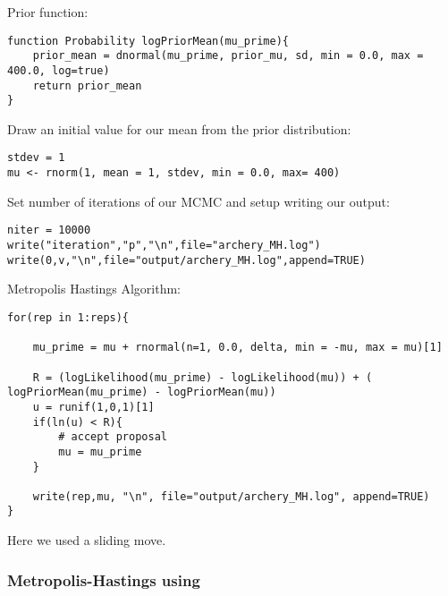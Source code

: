 Prior function: 

{\tt \begin{snugshade*}
 \begin{lstlisting}
function Probability logPriorMean(mu_prime){
	prior_mean = dnormal(mu_prime, prior_mu, sd, min = 0.0, max = 400.0, log=true)
	return prior_mean
}
\end{lstlisting}
\end{snugshade*}}



Draw an initial value for our mean from the prior distribution:

{\tt \begin{snugshade*}
 \begin{lstlisting}
stdev = 1
mu <- rnorm(1, mean = 1, stdev, min = 0.0, max= 400)
\end{lstlisting}
\end{snugshade*}}

Set number of iterations of our MCMC and setup writing our output:

{\tt \begin{snugshade*}
 \begin{lstlisting}
niter = 10000
write("iteration","p","\n",file="archery_MH.log")
write(0,v,"\n",file="output/archery_MH.log",append=TRUE)
\end{lstlisting}
\end{snugshade*}}


Metropolis Hastings Algorithm:

{\tt \begin{snugshade*}
 \begin{lstlisting}
for(rep in 1:reps){

	mu_prime = mu + rnormal(n=1, 0.0, delta, min = -mu, max = mu)[1] 

	R = (logLikelihood(mu_prime) - logLikelihood(mu)) + ( logPriorMean(mu_prime) - logPriorMean(mu)) 
	u = runif(1,0,1)[1] 
	if(ln(u) < R){
		# accept proposal
		mu = mu_prime 
	} 

	write(rep,mu, "\n", file="output/archery_MH.log", append=TRUE) 
} 
\end{lstlisting}
\end{snugshade*}}


Here we used a sliding move. 

\subsubsection{Metropolis-Hastings using \RevBayes}

